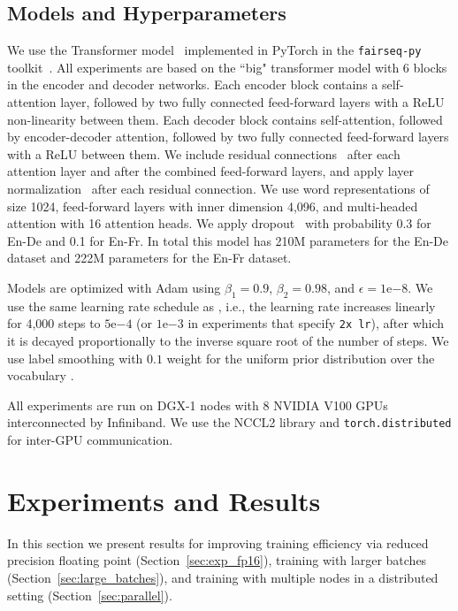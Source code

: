 \documentclass[11pt,a4paper]{article}
\begin{document}
\subsection{Models and Hyperparameters}

We use the Transformer model~\citep{vaswani2017transformer} implemented in PyTorch in the \texttt{fairseq-py} toolkit~\citep{fairseq}.
All experiments are based on the ``big" transformer model with 6 blocks in the encoder and decoder networks.
Each encoder block contains a self-attention layer, followed by two fully connected feed-forward layers with a ReLU non-linearity between them.
Each decoder block contains self-attention, followed by encoder-decoder attention, followed by two fully connected feed-forward layers with a ReLU between them.
We include residual connections~\cite{he2015deep} after each attention layer and after the combined feed-forward layers,
and apply layer normalization~\cite{ba2016layer} after each residual connection.
We use word representations of size 1024,
feed-forward layers with inner dimension 4,096,
and multi-headed attention with 16 attention heads.
We apply dropout~\cite{srivastava2014dropout} with probability 0.3 for En-De and 0.1 for En-Fr.
In total this model has 210M parameters for the En-De dataset and 222M parameters for the En-Fr dataset.

Models are optimized with Adam \citep{kingma2015adam} using $\beta_1 = 0.9$, $\beta_2 = 0.98$, and $\epsilon = 1\mathrm{e}{-8}$.
We use the same learning rate schedule as \citet{vaswani2017transformer}, i.e., the learning rate increases linearly for 4,000 steps to $5\mathrm{e}{-4}$ (or $1\mathrm{e}{-3}$ in experiments that specify \texttt{2x lr}),
after which it is decayed proportionally to the inverse square root of the number of steps.
We use label smoothing with $0.1$ weight for the uniform prior distribution over the vocabulary  \citep{szegedy2015inception,pereyra2017regularize}. 

All experiments are run on DGX-1 nodes with 8 NVIDIA\textsuperscript{\textcopyright} V100 GPUs interconnected by Infiniband. We use the NCCL2 library and \texttt{torch.distributed} for inter-GPU communication.

\section{Experiments and Results}\label{sec:results}

In this section we present results for improving training efficiency via reduced precision floating point (Section~\ref{sec:exp_fp16}), training with larger batches (Section~\ref{sec:large_batches}), and training with multiple nodes in a distributed setting (Section~\ref{sec:parallel}).
\end{document}
